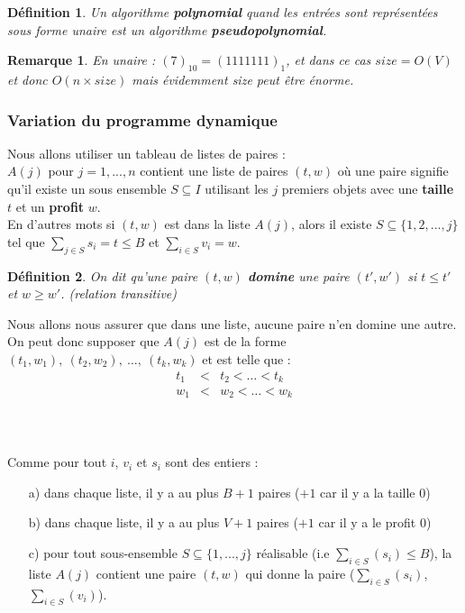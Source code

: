 \documentclass{article}
\newtheorem{de}{D\'efinition}[section]
\newtheorem{rem}{Remarque}[section]
\begin{document}
\begin{sffamily}
\begin{de}
Un algorithme \textbf{polynomial} quand les entrées sont représentées sous forme unaire est un algorithme \textbf{pseudopolynomial}.
\end{de}

\begin{rem}
En unaire : $(7)_{10} = (1111111)_1$, et dans ce cas $size = O(V)$ et donc $O(n\times size)$ mais évidemment size peut être énorme.
\end{rem}

\subsubsection{Variation du programme dynamique}

Nous allons utiliser un tableau de listes de paires : \\
$A(j)$ pour $j = 1,...,n$ contient une liste de paires $(t,w)$ où une paire signifie qu'il existe un sous ensemble $S\subseteq I$ utilisant 
les $j$ premiers objets avec une \textbf{taille} $t$ et un \textbf{profit} $w$. \\
En d'autres mots si $(t,w)$ est dans la liste $A(j)$, alors il existe $S\subseteq \{1,2,...,j\}$ tel que $\sum_{j\in S} s_i = t \leq B$ et 
$\sum_{i\in S} v_i = w$.

\begin{de}
On dit qu'une paire $(t,w)$ \textbf{domine} une paire $(t',w')$ si $t\leq t'$ et
$w \geq w'$. (relation transitive)
\end{de}

Nous allons nous assurer que dans une liste, aucune paire n'en domine une autre. On peut donc supposer que $A(j)$ est de la forme $(t_1,w_1),
\ (t_2,w_2),\ \ldots ,\ (t_k,w_k)$ et est telle que : 
\begin{eqnarray}
\nonumber t_1 & < & t_2 < \ldots < t_k \\
\nonumber w_1 & < & w_2 < \ldots < w_k
\end{eqnarray}
$ $\\
$ $\\
$ $\\

\noindent Comme pour tout $i$, $v_i$ et $s_i$ sont des entiers :
\begin{enumerate}
\item[a)] dans chaque liste, il y a au plus $B+1$ paires ($+1$ car il y a la taille $0$)
\item[b)] dans chaque liste, il y a au plus $V+1$ paires ($+1$ car il y a le profit $0$)
\item[c)] pour tout sous-ensemble $S\subseteq \{1,...,j\}$ réalisable (i.e $\sum_{i\in S}(s_i) \leq B$), la liste $A(j)$ contient une paire 
$(t,w)$ qui donne la paire ($\sum_{i\in S}(s_i)$,$\sum_{i\in S}(v_i)$).
\end{enumerate}


\end{sffamily}
\end{document}
